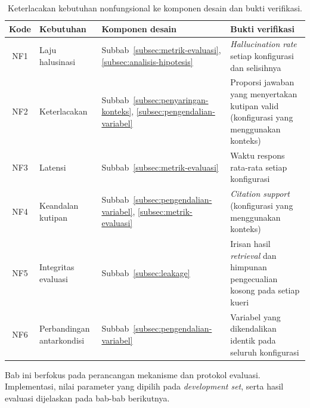 \begin{table}[!htbp]
\centering
\caption{Keterlacakan kebutuhan nonfungsional ke komponen desain dan bukti verifikasi.}
\label{tab:keterlacakan-nf}
\small
\begin{tabular}{|c|p{}|p{}|p{}|}
\hline
\textbf{Kode} & \textbf{Kebutuhan} & \textbf{Komponen desain} & \textbf{Bukti verifikasi} \\
\hline
NF1 & Laju halusinasi & Subbab~\ref{subsec:metrik-evaluasi}, \ref{subsec:analisis-hipotesis} & \emph{Hallucination rate} setiap konfigurasi dan selisihnya \\
\hline
NF2 & Keterlacakan & Subbab~\ref{subsec:penyaringan-konteks}, \ref{subsec:pengendalian-variabel} & Proporsi jawaban yang menyertakan kutipan valid (konfigurasi yang menggunakan konteks) \\
\hline
NF3 & Latensi & Subbab~\ref{subsec:metrik-evaluasi} & Waktu respons rata-rata setiap konfigurasi \\
\hline
NF4 & Keandalan kutipan & Subbab~\ref{subsec:pengendalian-variabel}, \ref{subsec:metrik-evaluasi} & \emph{Citation support} (konfigurasi yang menggunakan konteks) \\
\hline
NF5 & Integritas evaluasi & Subbab~\ref{subsec:leakage} & Irisan hasil \emph{retrieval} dan himpunan pengecualian kosong pada setiap kueri \\
\hline
NF6 & Perbandingan antarkondisi & Subbab~\ref{subsec:pengendalian-variabel} & Variabel yang dikendalikan identik pada seluruh konfigurasi \\
\hline
\end{tabular}
\end{table}

Bab ini berfokus pada perancangan mekanisme dan protokol evaluasi. Implementasi, nilai parameter yang dipilih pada \emph{development set}, serta hasil evaluasi dijelaskan pada bab-bab berikutnya.